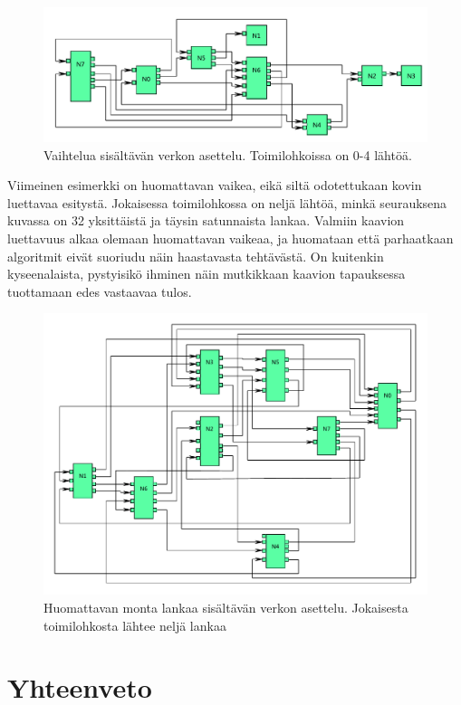 \documentclass[finnish,12pt]{article}
\begin{document}
\begin{figure}[ht]
	\includegraphics[width=\textwidth]{esim2.pdf}
	\caption{Vaihtelua sisältävän verkon asettelu. Toimilohkoissa on 0-4 lähtöä.}
\end{figure}

Viimeinen esimerkki on huomattavan vaikea, eikä siltä odotettukaan kovin luettavaa esitystä.
Jokaisessa toimilohkossa on neljä lähtöä, minkä seurauksena kuvassa on 32 yksittäistä ja täysin satunnaista lankaa.
Valmiin kaavion luettavuus alkaa olemaan huomattavan vaikeaa, ja huomataan että parhaatkaan algoritmit eivät suoriudu näin haastavasta tehtävästä.
On kuitenkin kyseenalaista, pystyisikö ihminen näin mutkikkaan kaavion tapauksessa tuottamaan edes vastaavaa tulos.

\begin{figure}[ht]
	\includegraphics[width=\textwidth]{esim3.pdf}
	\caption{Huomattavan monta lankaa sisältävän verkon asettelu. Jokaisesta toimilohkosta lähtee neljä lankaa}
\end{figure}


	\clearpage

	\section{Yhteenveto}
\end{document}
